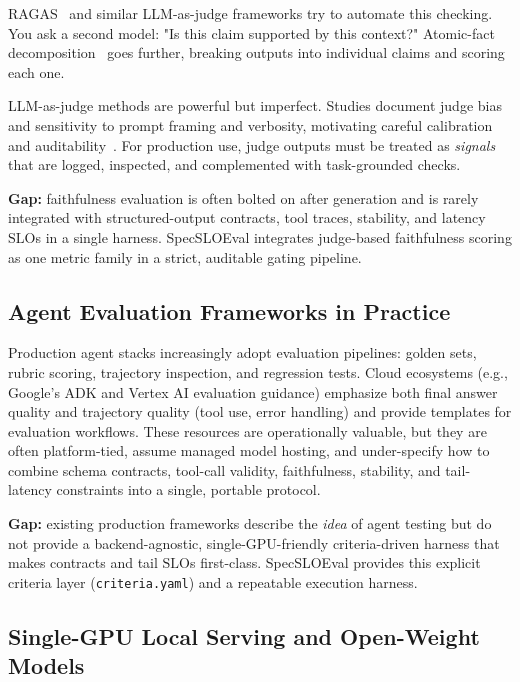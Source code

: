 \documentclass[11pt]{article}
\newcommand{\slo}{\ensuremath{\mathrm{SLO}}}
\begin{document}
RAGAS~\citep{es2023ragas} and similar LLM-as-judge frameworks try to automate this checking.
You ask a second model: "Is this claim supported by this context?"
Atomic-fact decomposition~\citep{atomicFacts2024} goes further, breaking outputs into individual claims and scoring each one.

LLM-as-judge methods are powerful but imperfect.
Studies document judge bias and sensitivity to prompt framing and verbosity, motivating careful calibration and auditability~\citep{chen2024humans}.
For production use, judge outputs must be treated as \emph{signals} that are logged, inspected, and complemented with task-grounded checks.

\textbf{Gap:} faithfulness evaluation is often bolted on after generation and is rarely integrated with structured-output contracts, tool traces, stability, and latency \slo s in a single harness.
SpecSLOEval integrates judge-based faithfulness scoring as one metric family in a strict, auditable gating pipeline.

\subsection{Agent Evaluation Frameworks in Practice}

Production agent stacks increasingly adopt evaluation pipelines: golden sets, rubric scoring, trajectory inspection, and regression tests.
Cloud ecosystems (e.g., Google’s ADK and Vertex AI evaluation guidance) emphasize both final answer quality and trajectory quality (tool use, error handling) and provide templates for evaluation workflows.
These resources are operationally valuable, but they are often platform-tied, assume managed model hosting, and under-specify how to combine schema contracts, tool-call validity, faithfulness, stability, and tail-latency constraints into a single, portable protocol.

\textbf{Gap:} existing production frameworks describe the \emph{idea} of agent testing but do not provide a backend-agnostic, single-GPU-friendly criteria-driven harness that makes contracts and tail \slo s first-class.
SpecSLOEval provides this explicit criteria layer (\texttt{criteria.yaml}) and a repeatable execution harness.

\subsection{Single-GPU Local Serving and Open-Weight Models}
\end{document}
